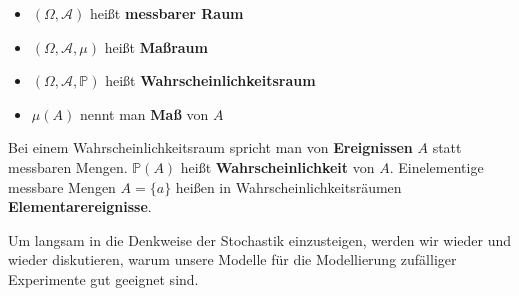 \begin{deff} \abs
	\begin{itemize}
		\item $(\Omega, \mathcal{A})$ heißt \textbf{messbarer Raum}
		\item $(\Omega, \mathcal{A}, \mu)$ heißt \textbf{Maßraum}
		\item $(\Omega, \mathcal{A}, \mathbb P)$ heißt \textbf{Wahrscheinlichkeitsraum}
		\item $\mu (A)$ nennt man \textbf{Maß} von $A$ 
	\end{itemize}

\end{deff}

\begin{bem1}
	Bei einem Wahrscheinlichkeitsraum spricht man von \textbf{Ereignissen} $A$ statt messbaren Mengen. $\mathbb P(A)$ heißt \textbf{Wahrscheinlichkeit} von $A$. Einelementige messbare Mengen $A = \{a\}$ heißen in Wahrscheinlichkeitsräumen \textbf{Elementarereignisse}.
\end{bem1}

Um langsam in die Denkweise der Stochastik einzusteigen, werden wir wieder und wieder diskutieren, warum unsere Modelle f\"ur die Modellierung zuf\"alliger Experimente gut geeignet sind. 

